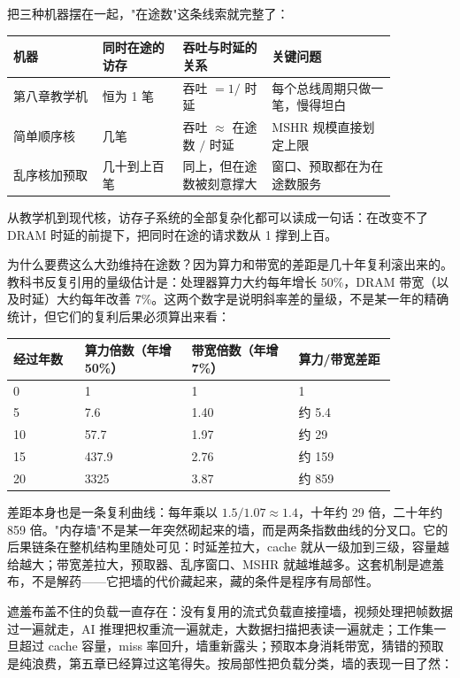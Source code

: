 把三种机器摆在一起，"在途数"这条线索就完整了：

\begin{longtable}{L{0.20\linewidth}L{0.18\linewidth}L{0.20\linewidth}L{0.28\linewidth}}
\toprule
机器 & 同时在途的访存 & 吞吐与时延的关系 & 关键问题 \\
\midrule
第八章教学机 & 恒为 1 笔 & 吞吐 $=1/$ 时延 & 每个总线周期只做一笔，慢得坦白 \\
简单顺序核 & 几笔 & 吞吐 $\approx$ 在途数 $/$ 时延 & MSHR 规模直接划定上限 \\
乱序核加预取 & 几十到上百笔 & 同上，但在途数被刻意撑大 & 窗口、预取都在为在途数服务 \\
\bottomrule
\end{longtable}

从教学机到现代核，访存子系统的全部复杂化都可以读成一句话：在改变不了 DRAM 时延的前提下，把同时在途的请求数从 1 撑到上百。

为什么要费这么大劲维持在途数？因为算力和带宽的差距是几十年复利滚出来的。教科书反复引用的量级估计是：处理器算力大约每年增长 50\%，DRAM 带宽（以及时延）大约每年改善 7\%。这两个数字是说明斜率差的量级，不是某一年的精确统计，但它们的复利后果必须算出来看：

\begin{longtable}{L{0.16\linewidth}L{0.24\linewidth}L{0.24\linewidth}L{0.22\linewidth}}
\toprule
经过年数 & 算力倍数（年增 50\%） & 带宽倍数（年增 7\%） & 算力/带宽差距 \\
 & 1 & 1 & 1 \\
5 & 7.6 & 1.40 & 约 5.4 \\
10 & 57.7 & 1.97 & 约 29 \\
15 & 437.9 & 2.76 & 约 159 \\
20 & 3325 & 3.87 & 约 859 \\
\bottomrule
\end{longtable}

差距本身也是一条复利曲线：每年乘以 $1.5/1.07\approx1.4$，十年约 29 倍，二十年约 859 倍。"内存墙"不是某一年突然砌起来的墙，而是两条指数曲线的分叉口。它的后果链条在整机结构里随处可见：时延差拉大，cache 就从一级加到三级，容量越给越大；带宽差拉大，预取器、乱序窗口、MSHR 就越堆越多。这套机制是遮羞布，不是解药——它把墙的代价藏起来，藏的条件是程序有局部性。

遮羞布盖不住的负载一直存在：没有复用的流式负载直接撞墙，视频处理把帧数据过一遍就走，AI 推理把权重流一遍就走，大数据扫描把表读一遍就走；工作集一旦超过 cache 容量，miss 率回升，墙重新露头；预取本身消耗带宽，猜错的预取是纯浪费，第五章已经算过这笔得失。按局部性把负载分类，墙的表现一目了然：

